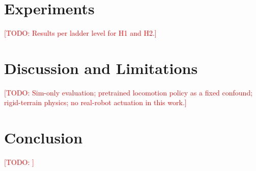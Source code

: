 \documentclass[conference]{IEEEtran}
\newcommand{\todo}[1]{\textcolor{red}{[TODO: #1]}}
\begin{document}
\section{Experiments}
\todo{Results per ladder level for H1 and H2.}

\section{Discussion and Limitations}
\todo{Sim-only evaluation; pretrained locomotion policy as a fixed
confound; rigid-terrain physics; no real-robot actuation in this work.}

\section{Conclusion}
\todo{}



\end{document}
